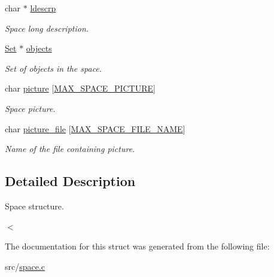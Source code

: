 \begin{DoxyCompactItemize}
char $\ast$ \hyperlink{struct__Space_adec57201467259116cb2a27a3ee8d214}{ldescrp}
\begin{DoxyCompactList}\small\item\em Space long description. \end{DoxyCompactList}\item 
\mbox{\label{struct__Space_a661ed8b0fc8085b6db70188aa5085625}} 
\hyperlink{set_8h_a6d3b7f7c92cbb4577ef3ef7ddbf93161}{Set} $\ast$ \hyperlink{struct__Space_a661ed8b0fc8085b6db70188aa5085625}{objects}
\begin{DoxyCompactList}\small\item\em Set of objects in the space. \end{DoxyCompactList}\item 
\mbox{\label{struct__Space_adfb0c2325d408d79fd790d7c3ca3228e}} 
char \hyperlink{struct__Space_adfb0c2325d408d79fd790d7c3ca3228e}{picture} \mbox{[}\hyperlink{space_8h_a81ff4df6e3833e5b8f8bd6255f4e3df6}{M\+A\+X\+\_\+\+S\+P\+A\+C\+E\+\_\+\+P\+I\+C\+T\+U\+RE}\mbox{]}
\begin{DoxyCompactList}\small\item\em Space picture. \end{DoxyCompactList}\item 
\mbox{\label{struct__Space_a740984e7107ec8cfdd8d45186b0fadb9}} 
char \hyperlink{struct__Space_a740984e7107ec8cfdd8d45186b0fadb9}{picture\+\_\+file} \mbox{[}\hyperlink{space_8h_aff1f45ee7107c3418467cc9c36973490}{M\+A\+X\+\_\+\+S\+P\+A\+C\+E\+\_\+\+F\+I\+L\+E\+\_\+\+N\+A\+ME}\mbox{]}
\begin{DoxyCompactList}\small\item\em Name of the file containing picture. \end{DoxyCompactList}\end{DoxyCompactItemize}


\subsection{Detailed Description}
Space structure. 

$<$ 

The documentation for this struct was generated from the following file\+:\begin{DoxyCompactItemize}
\item 
src/\hyperlink{space_8c}{space.\+c}\end{DoxyCompactItemize}

